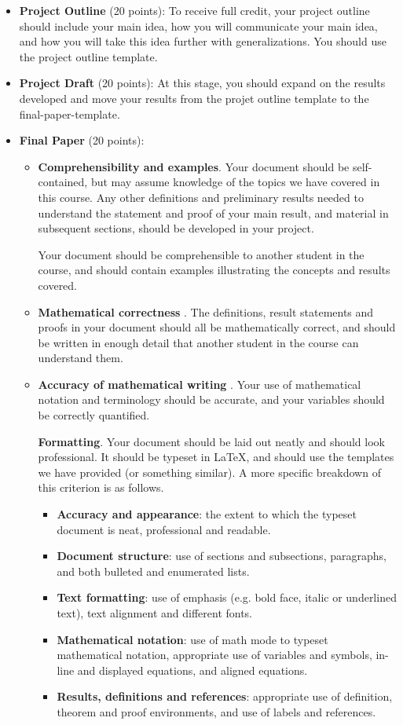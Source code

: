 \documentclass{article}
\begin{document}
\begin{itemize}
    \item \textbf{Project Outline} (20 points): To receive full credit, your project outline should include your main idea, how you will communicate your main idea, and how you will take this idea further with generalizations. You should use the project outline template.
    \item \textbf{Project Draft} (20 points): At this stage, you should expand on the results developed and move your results from the projet outline template to the final-paper-template.

    \item \textbf{Final Paper} (20 points):
    \begin{itemize}
        \item \textbf{Comprehensibility and examples}. 
        Your document should be self-contained, but may assume knowledge of the topics we have covered in this course. Any other definitions and preliminary results needed to understand the statement and proof of your main result, and material in subsequent sections, should be developed in your project.
        
        Your document should be comprehensible to another student in the course, and should contain examples illustrating the concepts and results covered.
        \item \textbf{Mathematical correctness} . The definitions, result statements and proofs in your document should all be mathematically correct, and should be written in enough detail that another student in the course can understand them.
        \item \textbf{Accuracy of mathematical writing} . Your use of mathematical notation and terminology should be accurate, and your variables should be correctly quantified.
    
        \textbf{Formatting}. Your document should be laid out neatly and should look professional. It should be typeset in \LaTeX, and should use the templates we have provided (or something similar). A more specific breakdown of this criterion is as follows.
        \begin{itemize}
            \item \textbf{Accuracy and appearance}: the extent to which the typeset document is neat, professional and readable.
            \item \textbf{Document structure}: use of sections and subsections, paragraphs, and both bulleted and enumerated lists.
            \item \textbf{Text formatting}: use of emphasis (e.g. bold face, italic or underlined text), text alignment and different fonts.
            \item \textbf{Mathematical notation}: use of math mode to typeset mathematical notation, appropriate use of variables and symbols, in-line and displayed equations, and aligned equations.
            \item \textbf{Results, definitions and references}: appropriate use of definition, theorem and proof environments, and use of labels and references.
        \end{itemize}
    \end{itemize}


\end{itemize}
\end{document}
